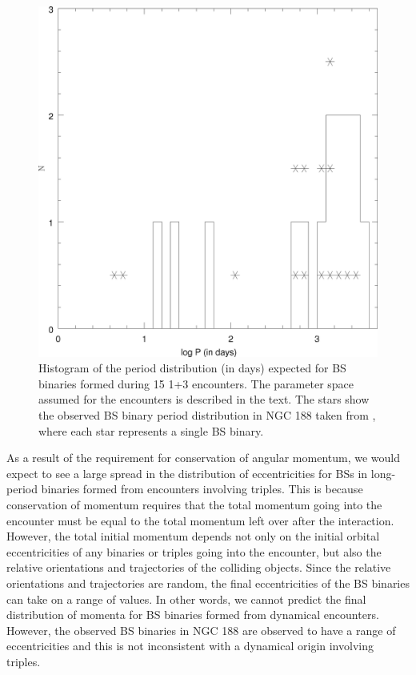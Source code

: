 \begin{enumerate}
\begin{figure} [!h]
  \begin{center}
 \includegraphics[scale=0.5]{Chapter-2/fig3.eps}
    \caption[Histogram of the period distribution expected for BS binaries
formed during 1+3 encounters]{Histogram of the period distribution (in
  days) expected for BS binaries formed during 15 1+3 encounters.
  The parameter space assumed for the encounters is described in the
  text.  The stars show the observed BS binary period
  distribution in NGC 188 taken from \citet{mathieu09}, where each
  star represents a single BS binary.
    \label{fig:per-num}}
  \end{center}
\end{figure}

As a result of the requirement for conservation of angular
momentum, we would expect to see a large spread in the distribution of
eccentricities for BSs in long-period binaries formed from encounters
involving triples.  This is because conservation of momentum requires
that the total momentum going into the encounter must be
equal to the total momentum left over after the interaction.  
However, the total initial momentum depends not only on the
initial orbital eccentricities of any binaries or triples going into the
encounter, but also the relative orientations and trajectories of the
colliding objects.  Since the relative orientations and trajectories
are random, the final eccentricities of the BS binaries can take on a
range of values.  In other words, we cannot predict the final distribution of
momenta for BS binaries formed from dynamical encounters.  However,
the observed BS binaries in NGC 188 are observed to 
have a range of eccentricities and this is not inconsistent with a
dynamical origin involving triples.


\end{enumerate}
